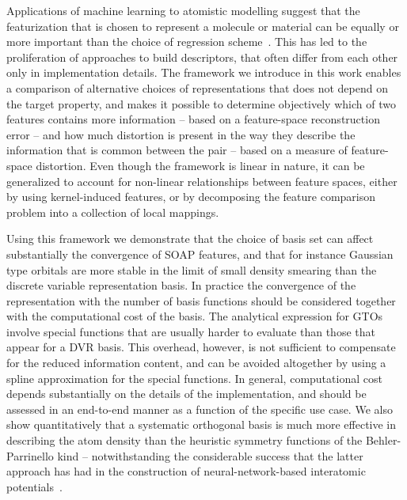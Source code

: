Applications of machine learning to atomistic modelling suggest that the featurization that is chosen to represent a molecule or material can be equally or more important than the choice of regression scheme~\cite{fabe+17jctc}. 
This has led to the proliferation of approaches to build descriptors, that often differ from each other only in implementation details. 
The framework we introduce in this work enables a comparison of alternative choices of representations that does not depend on the target property, and makes it possible to determine objectively which of two features contains more information -- based on a feature-space reconstruction error --  and how much distortion is present in the way they describe the information that is common between the pair -- based on a measure of feature-space distortion. 
Even though the framework is linear in nature, it can be generalized to account for non-linear relationships between feature spaces, either by using kernel-induced features, or by decomposing the feature comparison problem into a collection of local mappings. 

Using this framework we demonstrate that the choice of basis set can affect substantially the convergence of SOAP features, and that for instance  Gaussian type orbitals are more stable in the limit of small density smearing than the discrete variable representation basis. 
In practice the convergence of the representation with the number of basis functions should be considered together with the computational cost of the basis. The analytical expression for GTOs involve special functions that are usually harder to evaluate than those that appear for a DVR basis. This overhead, however, is not sufficient to compensate for the reduced information content, and can be avoided altogether by using a spline approximation for the special functions. In general, computational cost depends substantially on the details of the implementation, and should be assessed in an end-to-end manner as a function of the specific use case.
We also show quantitatively that a systematic orthogonal basis is much more effective in describing the atom density than the heuristic symmetry functions of the Behler-Parrinello kind -- notwithstanding the considerable success that the latter approach has had in the construction of neural-network-based interatomic potentials~\cite{behl16jcp}. 

